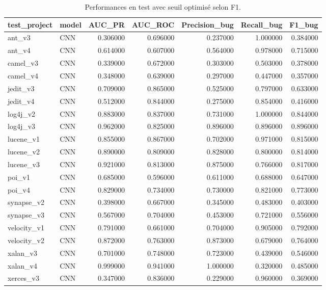 \begin{table}
\caption{Performances en test avec seuil optimisé selon F1.}
\label{tab:results_f1}
\begin{tabular}{llrrrrr}
\toprule
test_project & model & AUC_PR & AUC_ROC & Precision_bug & Recall_bug & F1_bug \\
\midrule
ant_v3 & CNN & 0.306000 & 0.696000 & 0.237000 & 1.000000 & 0.384000 \\
ant_v4 & CNN & 0.614000 & 0.607000 & 0.564000 & 0.978000 & 0.715000 \\
camel_v3 & CNN & 0.339000 & 0.672000 & 0.303000 & 0.503000 & 0.378000 \\
camel_v4 & CNN & 0.348000 & 0.639000 & 0.297000 & 0.447000 & 0.357000 \\
jedit_v3 & CNN & 0.709000 & 0.865000 & 0.525000 & 0.797000 & 0.633000 \\
jedit_v4 & CNN & 0.512000 & 0.844000 & 0.275000 & 0.854000 & 0.416000 \\
log4j_v2 & CNN & 0.883000 & 0.837000 & 0.731000 & 1.000000 & 0.844000 \\
log4j_v3 & CNN & 0.962000 & 0.825000 & 0.896000 & 0.896000 & 0.896000 \\
lucene_v1 & CNN & 0.855000 & 0.867000 & 0.702000 & 0.971000 & 0.815000 \\
lucene_v2 & CNN & 0.890000 & 0.809000 & 0.828000 & 0.800000 & 0.814000 \\
lucene_v3 & CNN & 0.921000 & 0.813000 & 0.875000 & 0.766000 & 0.817000 \\
poi_v1 & CNN & 0.685000 & 0.596000 & 0.611000 & 0.688000 & 0.647000 \\
poi_v4 & CNN & 0.829000 & 0.734000 & 0.730000 & 0.821000 & 0.773000 \\
synapse_v2 & CNN & 0.398000 & 0.667000 & 0.345000 & 0.483000 & 0.403000 \\
synapse_v3 & CNN & 0.567000 & 0.704000 & 0.453000 & 0.721000 & 0.556000 \\
velocity_v1 & CNN & 0.791000 & 0.661000 & 0.704000 & 0.905000 & 0.792000 \\
velocity_v2 & CNN & 0.872000 & 0.763000 & 0.873000 & 0.679000 & 0.764000 \\
xalan_v3 & CNN & 0.701000 & 0.748000 & 0.723000 & 0.439000 & 0.546000 \\
xalan_v4 & CNN & 0.999000 & 0.941000 & 1.000000 & 0.320000 & 0.485000 \\
xerces_v3 & CNN & 0.347000 & 0.836000 & 0.229000 & 0.960000 & 0.369000 \\

\end{tabular}
\end{table}
